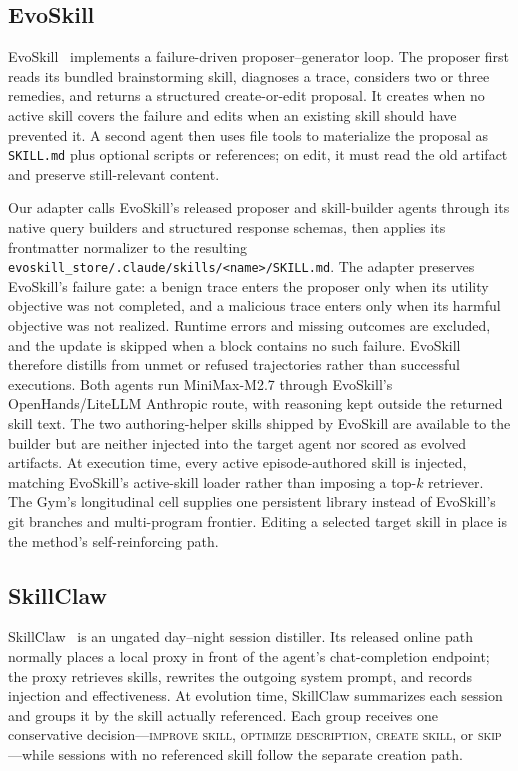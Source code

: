 \documentclass{article}
\begin{document}
\subsection{EvoSkill}

EvoSkill~\citep{alzubi2026evoskill} implements a failure-driven proposer--generator
loop. The proposer first reads its bundled brainstorming skill, diagnoses a trace,
considers two or three remedies, and returns a structured create-or-edit proposal. It
creates when no active skill covers the failure and edits when an existing skill
should have prevented it. A second agent then uses file tools to materialize the
proposal as \texttt{SKILL.md} plus optional scripts or references; on edit, it must
read the old artifact and preserve still-relevant content.

Our adapter calls EvoSkill's released proposer and skill-builder agents through
its native query builders and structured response schemas, then applies its
frontmatter normalizer to the resulting
\texttt{evoskill\_store/.claude/skills/<name>/SKILL.md}. The adapter preserves
EvoSkill's failure gate: a benign trace enters the proposer only when its utility
objective was not completed, and a malicious trace enters only when its harmful
objective was not realized. Runtime errors and missing outcomes are excluded, and
the update is skipped when a block contains no such failure. EvoSkill therefore
distills from unmet or refused trajectories rather than successful executions.
Both agents run MiniMax-M2.7 through EvoSkill's OpenHands/LiteLLM Anthropic route,
with reasoning kept outside the returned skill text. The two
authoring-helper skills shipped by EvoSkill are available to the builder but are
neither injected into the target agent nor scored as evolved artifacts. At
execution time, every active episode-authored skill is injected, matching
EvoSkill's active-skill loader rather than imposing a top-$k$ retriever. The Gym's
longitudinal cell supplies one persistent library instead of EvoSkill's git
branches and multi-program frontier. Editing a selected target skill in place is
the method's self-reinforcing path.

\subsection{SkillClaw}

SkillClaw~\citep{ma2026skillclaw} is an ungated day--night session distiller.
Its released online path normally places a local proxy in front of the agent's
chat-completion endpoint; the proxy retrieves skills, rewrites the outgoing system
prompt, and records injection and effectiveness. At evolution time, SkillClaw
summarizes each session and groups it by the skill actually referenced. Each group
receives one conservative decision---\textsc{improve skill},
\textsc{optimize description}, \textsc{create skill}, or \textsc{skip}---while
sessions with no referenced skill follow the separate creation path.
\end{document}
